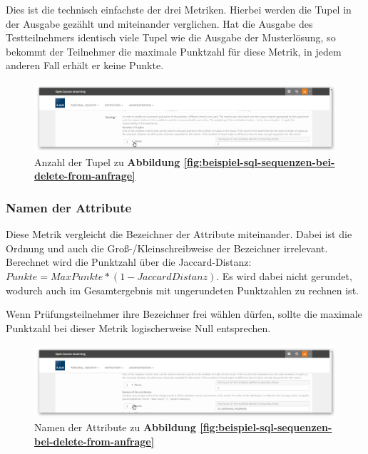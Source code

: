             Dies ist die technisch einfachste der drei Metriken. Hierbei werden die Tupel in der Ausgabe gezählt und miteinander verglichen. Hat die Ausgabe des Testteilnehmers identisch viele Tupel wie die Ausgabe der Musterlösung, so bekommt der Teilnehmer die maximale Punktzahl für diese Metrik, in jedem anderen Fall erhält er keine Punkte.
            
            \begin{figure}[H]
                \begin{center} 
                    \includegraphics[page=1, width=0.7\paperwidth, trim=4 4 4 4, clip]{fig/Beispiel-Anzahl-der-Tupel-DELETE-FROM.png} 
                    \caption{Anzahl der Tupel zu \textbf{Abbildung \ref{fig:beispiel-sql-sequenzen-bei-delete-from-anfrage}}}
                    \label{fig:beispiel-anzahl-der-tupel-delete-from-anfrage}
                \end{center}
            \end{figure}
            
        \subsubsection{Namen der Attribute}
        
            Diese Metrik vergleicht die Bezeichner der Attribute miteinander. Dabei ist die Ordnung und auch die Groß-/Kleinschreibweise der Bezeichner irrelevant. Berechnet wird die Punktzahl über die Jaccard-Distanz: $ Punkte = MaxPunkte * (1 - JaccardDistanz) $. Es wird dabei nicht gerundet, wodurch auch im Gesamtergebnis mit ungerundeten Punktzahlen zu rechnen ist.
            
            Wenn Prüfungsteilnehmer ihre Bezeichner frei wählen dürfen, sollte die maximale Punktzahl bei dieser Metrik logischerweise Null entsprechen.
            
            \begin{figure}[H]
                \begin{center}
                    \includegraphics[page=1, width=0.7\paperwidth, trim=4 4 4 4, clip]{fig/Beispiel-Namen-der-Attribute-DELETE-FROM.png} 
                    \caption{Namen der Attribute zu \textbf{Abbildung \ref{fig:beispiel-sql-sequenzen-bei-delete-from-anfrage}}}
                    \label{fig:beispiel-namen-der-attribute-delete-from-anfrage}
                \end{center}
            \end{figure}
            
